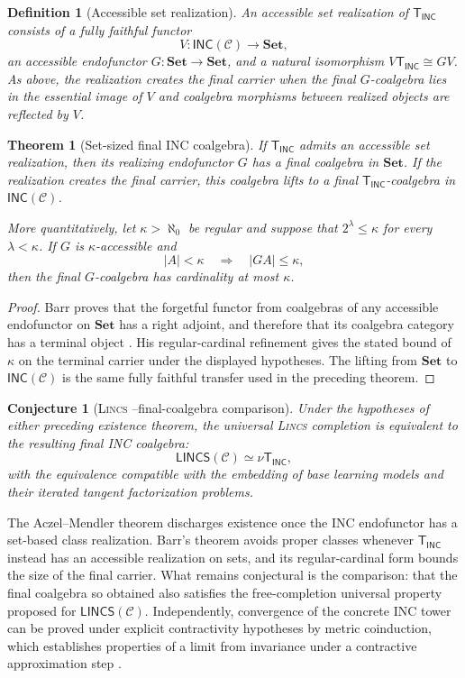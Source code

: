 \documentclass{article}
\newtheorem{definition}{Definition}
\newtheorem{theorem}{Theorem}
\newtheorem{conjecture}{Conjecture}
\newcommand{\C}{\mathcal{C}}
\newcommand{\T}{\mathsf{T}}
\newcommand{\LINCS}{\mathsf{LINCS}}
\newcommand{\INC}{\mathsf{INC}}
\begin{document}
\begin{definition}[Accessible set realization]
An accessible set realization of \(\T_{\INC}\) consists of a fully faithful
functor
\[
V:\mathsf{INC}(\C)\longrightarrow\mathbf{Set},
\]
an accessible endofunctor \(G:\mathbf{Set}\to\mathbf{Set}\), and a natural
isomorphism \(V\T_{\INC}\cong GV\).  As above, the realization
\emph{creates the final carrier} when the final \(G\)-coalgebra lies in the
essential image of \(V\) and coalgebra morphisms between realized objects are
reflected by \(V\).
\end{definition}

\begin{theorem}[Set-sized final INC coalgebra]
If \(\T_{\INC}\) admits an accessible set realization, then its realizing
endofunctor \(G\) has a final coalgebra in \(\mathbf{Set}\).  If the
realization creates the final carrier, this coalgebra lifts to a final
\(\T_{\INC}\)-coalgebra in \(\mathsf{INC}(\C)\).

More quantitatively, let \(\kappa>\aleph_0\) be regular and suppose that
\(2^\lambda\leq\kappa\) for every \(\lambda<\kappa\).  If \(G\) is
\(\kappa\)-accessible and
\[
|A|<\kappa\quad\Longrightarrow\quad |G A|\leq\kappa,
\]
then the final \(G\)-coalgebra has cardinality at most \(\kappa\).
\end{theorem}

\begin{proof}
Barr proves that the forgetful functor from coalgebras of any accessible
endofunctor on \(\mathbf{Set}\) has a right adjoint, and therefore that its
coalgebra category has a terminal object \citep{barr1993terminal}.  His
regular-cardinal refinement gives the stated bound of \(\kappa\) on the
terminal carrier under the displayed hypotheses.  The lifting from
\(\mathbf{Set}\) to \(\mathsf{INC}(\C)\) is the same fully faithful transfer
used in the preceding theorem.\qedhere
\end{proof}

\begin{conjecture}[\textsc{Lincs}  --final-coalgebra comparison]
Under the hypotheses of either preceding existence theorem, the universal
\textsc{Lincs}   completion is equivalent to the resulting final INC coalgebra:
\[
\LINCS(\C)
  \simeq
  \nu \T_{\INC},
\]
with the equivalence compatible with the embedding of base learning models and
their iterated tangent factorization problems.
\end{conjecture}

The Aczel--Mendler theorem discharges existence once the INC endofunctor has a
set-based class realization.  Barr's theorem avoids proper classes whenever
\(\T_{\INC}\) instead has an accessible realization on sets, and its
regular-cardinal form bounds the size of the final carrier.  What remains
conjectural is the comparison: that the final coalgebra so obtained also
satisfies the free-completion universal property proposed for
\(\LINCS(\C)\).  Independently, convergence of the concrete INC tower can be
proved under explicit contractivity hypotheses by metric coinduction, which
establishes properties of a limit from invariance under a contractive
approximation step \citep{kozen2009metric}.
\end{document}
